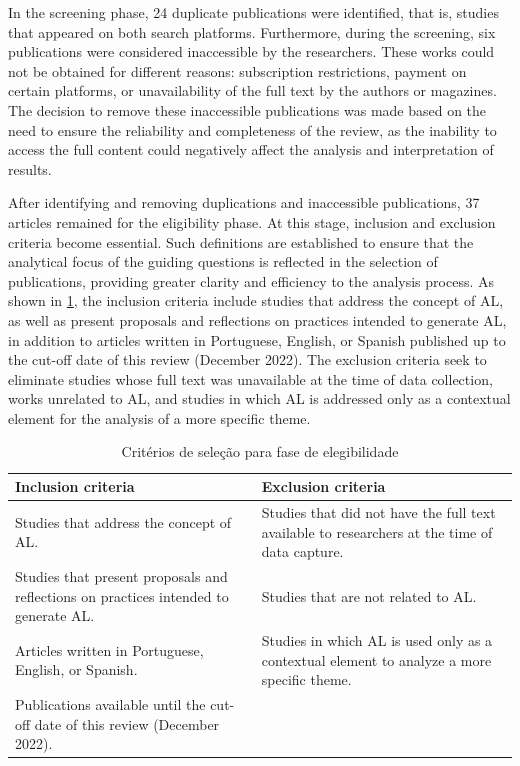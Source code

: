 In the screening phase, 24 duplicate publications were identified, that is, studies that appeared on both search platforms. Furthermore, during the screening, six publications were considered inaccessible by the researchers. These works could not be obtained for different reasons: subscription restrictions, payment on certain platforms, or unavailability of the full text by the authors or magazines. The decision to remove these inaccessible publications was made based on the need to ensure the reliability and completeness of the review, as the inability to access the full content could negatively affect the analysis and interpretation of results.

After identifying and removing duplications and inaccessible publications, 37 articles remained for the eligibility phase. At this stage, inclusion and exclusion criteria become essential. Such definitions are established to ensure that the analytical focus of the guiding questions is reflected in the selection of publications, providing greater clarity and efficiency to the analysis process. As shown in \cref{tab-02}, the inclusion criteria include studies that address the concept of AL, as well as present proposals and reflections on practices intended to generate AL, in addition to articles written in Portuguese, English, or Spanish published up to the cut-off date of this review (December 2022). The exclusion criteria seek to eliminate studies whose full text was unavailable at the time of data collection, works unrelated to AL, and studies in which AL is addressed only as a contextual element for the analysis of a more specific theme.

   
\begin{table}[!htpb]
\centering
\begin{threeparttable}
\caption{Critérios de seleção para fase de elegibilidade}
\label{tab-02}
\begin{tabular}{p{} p{}}
\toprule
Inclusion criteria & Exclusion criteria \\
\midrule
Studies that address the concept of AL. & Studies that did not have the full text available to researchers at the time of data capture. \\
Studies that present proposals and reflections on practices intended to generate AL. & Studies that are not related to AL. \\
Articles written in Portuguese, English, or Spanish. & Studies in which AL is used only as a contextual element to analyze a more specific theme. \\
Publications available until the cut-off date of this review (December 2022). &  \\
\bottomrule
\end{tabular}
\end{threeparttable}
\end{table}   


